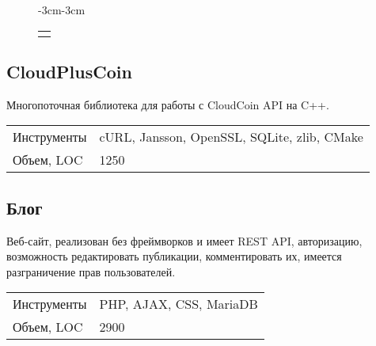 \documentclass[a4paper]{article}
\makeatletter
\newenvironment{figcont}[1]{
    \begin{figure}[H]
        \begin{adjustwidth}{-3cm}{-3cm}
        \centering
        \begin{tabular}{*{#1}c}
}{
        \end{tabular}
        \end{adjustwidth}
    \end{figure}
}
\newcommand{\subfig}[2]{
    \subfloat[#1]{\texttt{[image: figs/\#2]}}
}
\newenvironment{props}{
    \begin{tabular}{@{}lN{8cm}@{}}
}{
    \end{tabular}
}
\makeatother
\begin{document}
\begin{figcont}{1}
    \subfig{Фотография секундомера}{stopw1}
\end{figcont}

\subsection*{CloudPlusCoin}

Многопоточная библиотека для работы с CloudCoin API на C++.

\begin{props}
    Инструменты & cURL, Jansson, OpenSSL, SQLite, zlib, CMake \\
    Объем, LOC & 1250
\end{props}

\subsection*{Блог}

Веб-сайт, реализован без фреймворков и имеет REST API, авторизацию, возможность
редактировать публикации, комментировать их, имеется разграничение прав
пользователей.

\begin{props}
    Инструменты & PHP, AJAX, CSS, MariaDB \\
    Объем, LOC & 2900
\end{props}
\end{document}
